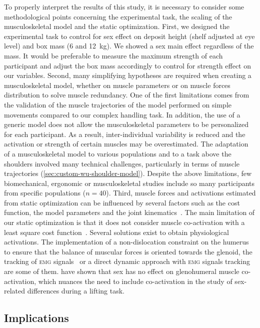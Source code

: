 To properly interpret the results of this study, it is necessary to consider some methodological points concerning the experimental task, the scaling of the musculoskeletal model and the static optimization.
First, we designed the experimental task to control for sex effect on deposit height (shelf adjusted at eye level) and box mass (6 and 12~kg).
We showed a sex main effect regardless of the mass.
It would be preferable to measure the maximum strength of each participant and adjust the box mass accordingly to control for strength effect on our variables.
Second, many simplifying hypotheses are required when creating a musculoskeletal model, whether on muscle parameters or on muscle forces distribution to solve muscle redundancy.
One of the first limitations comes from the validation of the muscle trajectories of the \citet{Wu2016-kw} model performed on simple movements compared to our complex handling task.
In addition, the use of a generic model does not allow the musculoskeletal parameters to be personalized for each participant.
As a result, inter-individual variability is reduced and the activation or strength of certain muscles may be overestimated.
The adaptation of a musculoskeletal model to various populations and to a task above the shoulders involved many technical challenges, particularly in terms of muscle trajectories (\ref{sec:custom-wu-shoulder-model}).
Despite the above limitations, few biomechanical, ergonomic or musculoskeletal studies include so many participants from specific populations ($n = 40$).
Third, muscle forces and activations estimated from static optimization can be influenced by several factors such as the cost function, the model parameters and the joint kinematics~\cite{Bolsterlee2013-ij, Gottlieb2000-ga}.
The main limitation of our static optimization is that it does not consider muscle co-activation with a least square cost function~\cite{Kian2019-gz}.
Several solutions exist to obtain physiological activations.
The implementation of a non-dislocation constraint on the humerus~\cite{Blache2017-pv} to ensure that the balance of muscular forces is oriented towards the glenoid, the tracking of \textsc{emg} signals~\cite{Pizzolato2015-gm} or a direct dynamic approach with \textsc{emg} signals tracking~\cite{Belaise2018-wo} are some of them.
\citet{Bouffard2019-fd} have shown that sex has no effect on glenohumeral muscle co-activation, which nuances the need to include co-activation in the study of sex-related differences during a lifting task.

\subsection{Implications}\label{subsec:implications}

